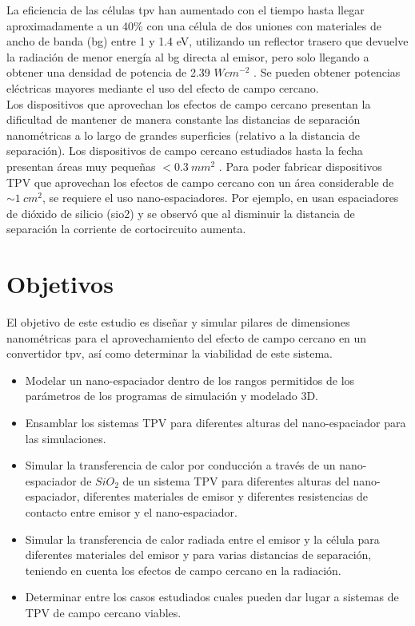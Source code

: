 La eficiencia de las células \acrshort{tpv} han aumentado con el tiempo hasta llegar aproximadamente a un 40\% con una célula de dos uniones con materiales de ancho de banda (\acrshort{bg}) entre 1 y 1.4 eV, utilizando un reflector trasero que devuelve la radiación de menor energía al \acrshort{bg} directa al emisor, pero solo llegando a obtener una densidad de potencia de 2.39 $W{cm}^{-2}$ \cite{ThermalConductivity_SiO2_2018}. Se pueden obtener potencias eléctricas mayores mediante el uso del efecto de campo cercano.\\

Los dispositivos que aprovechan los efectos de campo cercano presentan la dificultad de mantener de manera constante las distancias de separación nanométricas a lo largo de grandes superficies (relativo a la distancia de separación). Los dispositivos de campo cercano estudiados hasta la fecha presentan áreas muy pequeñas $<0.3 \ mm^2$ \cite{inoue_one-chip_2019_0_3mm2}. Para poder fabricar dispositivos TPV que aprovechan los efectos de campo cercano con un área considerable de $\sim 1 \ cm^2$, se requiere el uso nano-espaciadores. Por ejemplo, en \cite{doi:MicroGapTPV} usan espaciadores de dióxido de silicio (\gls{sio2}) y se observó que al disminuir la distancia de separación la corriente de cortocircuito aumenta.


\section{Objetivos}
El objetivo de este estudio es diseñar y simular pilares de dimensiones nanométricas para el aprovechamiento del efecto de campo cercano en un convertidor \acrshort{tpv}, así como determinar la viabilidad de este sistema. 
\begin{itemize}
	\item Modelar un nano-espaciador dentro de los rangos permitidos de los parámetros de los programas de simulación y modelado 3D.
	\item Ensamblar los sistemas TPV para diferentes alturas del nano-espaciador para las simulaciones.
	\item Simular la transferencia de calor por conducción a través de un nano-espaciador de $SiO_2$ de un sistema TPV para diferentes alturas del nano-espaciador, diferentes materiales de emisor y diferentes resistencias de contacto entre emisor y el nano-espaciador.
	\item Simular la transferencia de calor radiada entre el emisor y la célula para diferentes materiales del emisor y para varias distancias de separación, teniendo en cuenta los efectos de campo cercano en la radiación.
	\item Determinar entre los casos estudiados cuales pueden dar lugar a sistemas de TPV de campo cercano viables.
\end{itemize}

